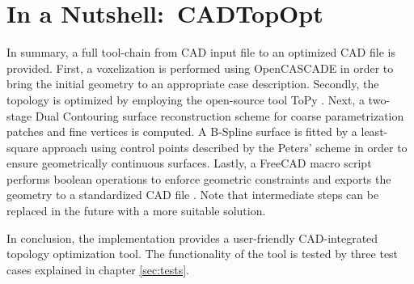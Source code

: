 \section{In a Nutshell:\ \acl{CADTopOpt}}
\label{sec:nutshell}
In summary, a full tool-chain from CAD input file to an optimized CAD file is provided. First, a voxelization is performed using OpenCASCADE in order to bring the initial geometry to an appropriate case description. Secondly, the topology is optimized by employing the open-source tool ToPy \cite{ToPy}.  
Next, a two-stage Dual Contouring surface reconstruction scheme for coarse parametrization patches and fine vertices is computed.
A B-Spline surface is fitted by a least-square approach using control points described by the Peters' scheme in order to ensure geometrically continuous surfaces. Lastly, a FreeCAD macro script performs boolean operations to enforce geometric constraints and exports the geometry to a standardized CAD file \cite{FreeCAD}.
Note that intermediate steps can be replaced in the future with a more suitable solution. 

In conclusion, the implementation provides a user-friendly CAD-integrated topology optimization tool. The functionality of the tool is tested by three test cases explained in chapter \ref{sec:tests}.

